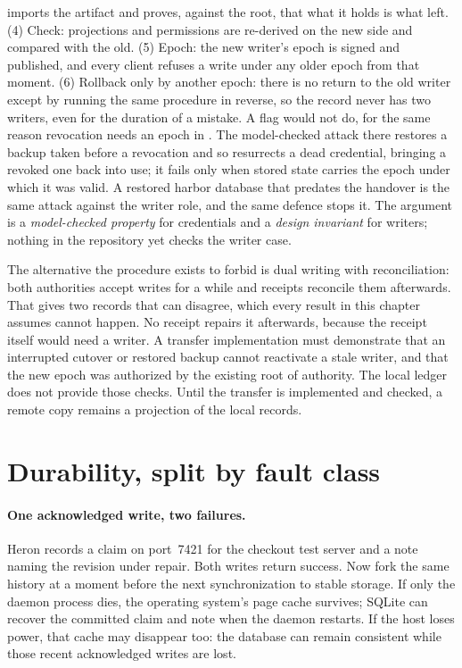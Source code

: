\documentclass[11pt,a4paper]{article}
\theoremstyle{definition}
\theoremstyle{remark}
\begin{document}
imports the artifact and proves, against the root, that what it holds is what
left. (4) Check: projections and permissions are re-derived on the new side
and compared with the old. (5) Epoch: the new writer's epoch is signed and
published, and every client refuses a write under any older epoch from that
moment. (6) Rollback only by another epoch: there is no return to the old
writer except by running the same procedure in reverse, so the record never
has two writers, even for the duration of a mistake. A flag would not do, for
the same reason revocation needs an epoch in . The model-checked attack there restores a backup taken before a
revocation and so resurrects a dead credential, bringing a revoked one back
into use; it fails only
when stored state carries the epoch under which it was valid. A restored
harbor database that predates the handover is the same attack against the
writer role, and the same defence stops it. The argument is a
\emph{model-checked property} for credentials and a \emph{design invariant}
for writers; nothing in the repository yet checks the writer case.
\begin{pdboundary}
\setlength{\parskip}{4pt plus 1pt}
The alternative the procedure exists to forbid is dual writing with
reconciliation: both authorities accept writes for a while and \mbox{receipts}
reconcile them afterwards. That gives two records that can disagree, which
every result in this chapter assumes cannot happen. No receipt repairs it
afterwards, because the receipt itself would need a writer.
A transfer implementation must demonstrate
that an interrupted cutover or restored backup cannot reactivate a stale writer,
and that the new epoch was authorized by the existing root of authority.
The local ledger does not provide those checks. Until the transfer is
implemented and checked, a remote copy remains a projection of the local
records.
\end{pdboundary}
\pdexercisepointer{\ref{ex:swk-schema-rename}}{\ref{ex:swk-op7-sequencer}}{\pageref{ex:swk-schema-rename}}
\section{Durability, split by fault class}
\label{sec:durability}
\paragraph{One acknowledged write, two failures.}
Heron records a claim on port~7421 for the checkout test server and a note
naming the revision under repair. Both writes return success. Now fork the
same history at a moment before the next synchronization to stable storage.
If only the daemon process dies, the operating system's page cache survives;
SQLite can recover the committed claim and note when the daemon restarts.
If the host loses power, that cache may disappear too: the database can remain
consistent while those recent acknowledged writes are lost.
\end{document}
